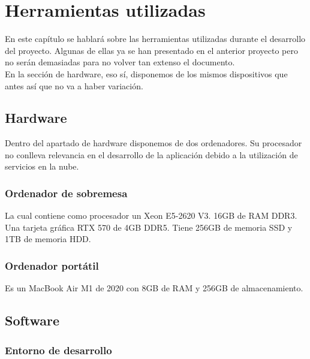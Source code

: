 \chapter{Herramientas utilizadas}

En este capítulo se hablará sobre las herramientas utilizadas durante el desarrollo del proyecto. Algunas de ellas ya se han presentado en el anterior proyecto pero no serán demasiadas para no volver tan extenso el documento.
\\En la sección de hardware, eso sí, disponemos de los mismos dispositivos que antes así que no va a haber variación.

\section{Hardware}

Dentro del apartado de hardware disponemos de dos ordenadores. Su procesador no conlleva relevancia en el desarrollo de la aplicación debido a la utilización de servicios en la nube.

\subsection{Ordenador de sobremesa}

La cual contiene como procesador un Xeon E5-2620 V3. 16GB de RAM DDR3. Una tarjeta gráfica RTX 570 de 4GB DDR5. Tiene 256GB de memoria SSD y 1TB de memoria HDD.

\subsection{Ordenador portátil}

Es un MacBook Air M1 de 2020 con 8GB de RAM y 256GB de almacenamiento.

\section{Software}

\subsection{Entorno de desarrollo}

